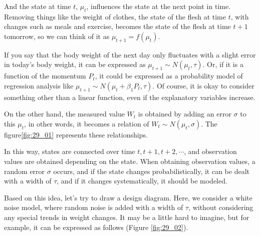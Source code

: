 \documentclass{ltjsbook}
\begin{document}
And the state at time $t$, $\mu_t$, influences the state at the next point in time. Removing things like the weight of clothes, the state of the flesh at time $t$, with changes such as meals and exercise, becomes the state of the flesh at time $t+1$ tomorrow, so we can think of it as $\mu_{t+1} = f(\mu_t)$.

If you say that the body weight of the next day only fluctuates with a slight error in today's body weight, it can be expressed as $\mu_{t+1} \sim N(\mu_t,\tau)$. Or, if it is a function of the momentum $P_t$, it could be expressed as a probability model of regression analysis like $\mu_{t+1} \sim N(\mu_t + \beta_1P_t,\tau)$. Of course, it is okay to consider something other than a linear function, even if the explanatory variables increase.

On the other hand, the measured value $W_t$ is obtained by adding an error $\sigma$ to this $\mu_t$, in other words, it becomes a relation of $W_t \sim N(\mu_t, \sigma)$. The figure\ref{fig:29_01} represents these relationships.

In this way, states are connected over time $t, t+1, t+2, \cdots$, and observation values are obtained depending on the state. When obtaining observation values, a random error $\sigma$ occurs, and if the state changes probabilistically, it can be dealt with a width of $\tau$, and if it changes systematically, it should be modeled.

Based on this idea, let's try to draw a design diagram. Here, we consider a white noise model, where random noise is added with a width of $\tau$, without considering any special trends in weight changes.
It may be a little hard to imagine, but for example, it can be expressed as follows (Figure \ref{fig:29_02}).

\end{document}
